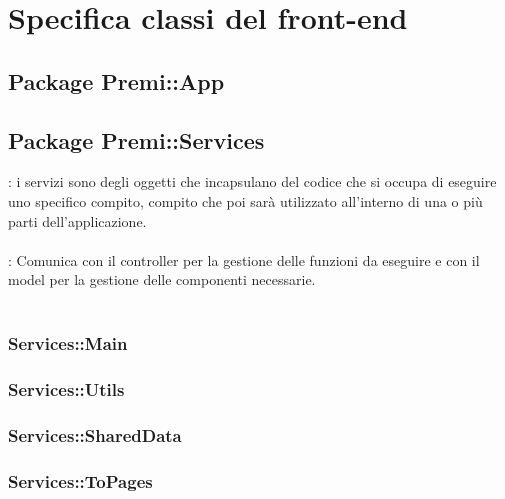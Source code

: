 \section {Specifica classi del front-end}
\subsection{Package Premi::App}

\subsection {Package Premi::Services}
\label{sec:services}
\textbf{\tipo}: i servizi sono degli oggetti che incapsulano del codice che si occupa di eseguire uno specifico compito, compito che poi sarà utilizzato all’interno di una o più parti dell’applicazione.\\\\
\textbf{\relaz}: Comunica con il controller per la gestione delle funzioni da eseguire e con il model per la gestione delle componenti necessarie.\\\\
\subsubsection{Services::Main}
\subsubsection{Services::Utils}
\subsubsection{Services::SharedData}
\subsubsection{Services::ToPages}


